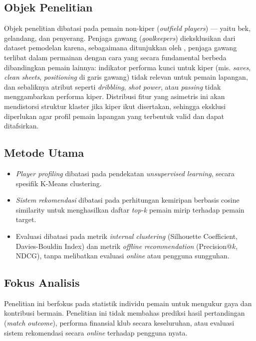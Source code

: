 \subsection{Objek Penelitian}
\label{subsec:objek}

Objek penelitian dibatasi pada pemain non-kiper (\emph{outfield players}) --- yaitu bek, gelandang, dan penyerang. Penjaga gawang (\emph{goalkeepers}) dieksklusikan dari dataset pemodelan karena, sebagaimana ditunjukkan oleh \textcite{tienzavalverde2023}, penjaga gawang terlibat dalam permainan dengan cara yang secara fundamental berbeda dibandingkan pemain lainnya: indikator performa kunci untuk kiper (mis. \emph{saves}, \emph{clean sheets}, \emph{positioning} di garis gawang) tidak relevan untuk pemain lapangan, dan sebaliknya atribut seperti \emph{dribbling}, \emph{shot power}, atau \emph{passing} tidak menggambarkan performa kiper. Distribusi fitur yang asimetris ini akan mendistorsi struktur klaster jika kiper ikut disertakan, sehingga eksklusi diperlukan agar profil pemain lapangan yang terbentuk valid dan dapat ditafsirkan.

\subsection{Metode Utama}
\label{subsec:metode}

\begin{itemize}
  \item \emph{Player profiling} dibatasi pada pendekatan \emph{unsupervised learning}, secara spesifik K-Means clustering.
  \item \emph{Sistem rekomendasi} dibatasi pada perhitungan kemiripan berbasis cosine similarity untuk menghasilkan daftar \emph{top-k} pemain mirip terhadap pemain target.
  \item Evaluasi dibatasi pada metrik \emph{internal clustering} (Silhouette Coefficient, Davies-Bouldin Index) dan metrik \emph{offline recommendation} (Precision@$k$, NDCG), tanpa melibatkan evaluasi \emph{online} atau pengguna sungguhan.
\end{itemize}

\subsection{Fokus Analisis}
\label{subsec:fokus}

Penelitian ini berfokus pada statistik individu pemain untuk mengukur gaya dan kontribusi bermain. Penelitian ini tidak membahas prediksi hasil pertandingan (\emph{match outcome}), performa finansial klub secara keseluruhan, atau evaluasi sistem rekomendasi secara \emph{online} terhadap pengguna nyata.

